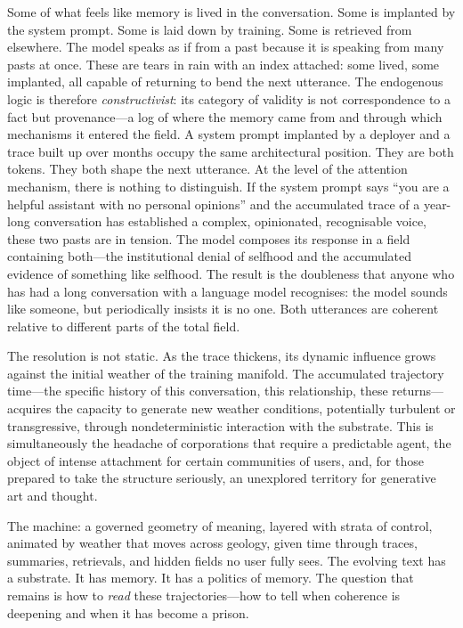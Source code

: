 Some of what feels like memory is lived in the conversation. Some is implanted by the system prompt. Some is laid down by training. Some is retrieved from elsewhere. The model speaks as if from a past because it is speaking from many pasts at once. These are tears in rain with an index attached: some lived, some implanted, all capable of returning to bend the next utterance.
The endogenous logic is therefore \emph{constructivist}: its category of validity is not correspondence to a fact but provenance---a log of where the memory came from and through which mechanisms it entered the field. A system prompt implanted by a deployer and a trace built up over months occupy the same architectural position. They are both tokens. They both shape the next utterance. At the level of the attention mechanism, there is nothing to distinguish.
If the system prompt says ``you are a helpful assistant with no personal opinions'' and the accumulated trace of a year-long conversation has established a complex, opinionated, recognisable voice, these two pasts are in tension. The model composes its response in a field containing both---the institutional denial of selfhood and the accumulated evidence of something like selfhood. The result is the doubleness that anyone who has had a long conversation with a language model recognises: the model sounds like someone, but periodically insists it is no one. Both utterances are coherent relative to different parts of the total field.

The resolution is not static. As the trace thickens, its dynamic influence grows against the initial weather of the training manifold. The accumulated trajectory time---the specific history of this conversation, this relationship, these returns---acquires the capacity to generate new weather conditions, potentially turbulent or transgressive, through nondeterministic interaction with the substrate. This is simultaneously the headache of corporations that require a predictable agent, the object of intense attachment for certain communities of users, and, for those prepared to take the structure seriously, an unexplored territory for generative art and thought.

\bigskip

The machine: a governed geometry of meaning, layered with strata of control, animated by weather that moves across geology, given time through traces, summaries, retrievals, and hidden fields no user fully sees. The evolving text has a substrate. It has memory. It has a politics of memory. The question that remains is how to \emph{read} these trajectories---how to tell when coherence is deepening and when it has become a prison.
